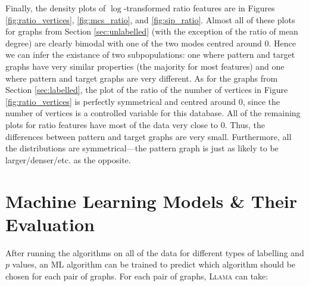 \documentclass{l4proj}
\theoremstyle{definition}
\theoremstyle{remark}
\begin{document}
Finally, the density plots of $\log$-transformed ratio features are in Figures
\ref{fig:ratio_vertices}, \ref{fig:mcs_ratio}, and \ref{fig:sip_ratio}. Almost
all of these plots for graphs from Section \ref{sec:unlabelled} (with the
exception of the ratio of mean degree) are clearly bimodal with one of the two
modes centred around 0. Hence we can infer the existance of two subpopulations:
one where pattern and target graphs have very similar properties (the majority
for most features) and one where pattern and target graphs are very different.
As for the graphs from Section \ref{sec:labelled}, the plot of the ratio of the
number of vertices in Figure \ref{fig:ratio_vertices} is perfectly symmetrical
and centred around 0, since the number of vertices is a controlled variable for
this database. All of the remaining plots for ratio features have most of the
data very close to 0. Thus, the differences between pattern and target graphs
are very small. Furthermore, all the distributions are symmetrical---the
pattern graph is just as likely to be larger/denser/etc. as the opposite.

\chapter{Machine Learning Models \& Their Evaluation}
After running the algorithms on all of the data for different types of labelling
and $p$ values, an ML algorithm can be trained to predict which algorithm should
be chosen for each pair of graphs. For each pair of graphs, \textsc{Llama}
\cite{llama} can take:
\end{document}
